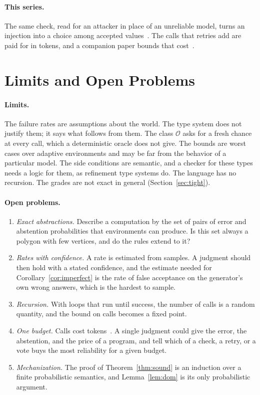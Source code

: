 \documentclass[acmsmall,nonacm,screen]{acmart}
\newcommand{\cO}{\mathcal{O}}
\begin{document}
\paragraph{This series.} The same check, read for an attacker in place of an unreliable
model, turns an injection into a choice among accepted values~\citep{tpp7}. The calls that
retries add are paid for in tokens, and a companion paper bounds that
cost~\citep{tpp6}.

\section{Limits and Open Problems}
\label{sec:limits}

\paragraph{Limits.} The failure rates are assumptions about the world. The type system does
not justify them; it says what follows from them. The class $\cO$ asks for a fresh chance at
every call, which a deterministic oracle does not give. The bounds are worst cases over
adaptive environments and may be far from the behavior of a particular model. The side
conditions are semantic, and a checker for these types needs a logic for them, as refinement
type systems do. The language has no recursion. The grades are not exact in general
(Section~\ref{sec:tight}).

\paragraph{Open problems.}
\begin{enumerate}
\item \emph{Exact abstractions.} Describe a computation by the set of pairs of error and
abstention probabilities that environments can produce. Is this set always a polygon with
few vertices, and do the rules extend to it?
\item \emph{Rates with confidence.} A rate is estimated from samples. A judgment should then
hold with a stated confidence, and the estimate needed for
Corollary~\ref{cor:imperfect} is the rate of false acceptance on the generator's own wrong
answers, which is the hardest to sample.
\item \emph{Recursion.} With loops that run until success, the number of calls is a random
quantity, and the bound on calls becomes a fixed point.
\item \emph{One budget.} Calls cost tokens~\citep{tpp6}. A single judgment could give the
error, the abstention, and the price of a program, and tell which of a check, a retry, or a
vote buys the most reliability for a given budget.
\item \emph{Mechanization.} The proof of Theorem~\ref{thm:sound} is an induction over a
finite probabilistic semantics, and Lemma~\ref{lem:dom} is its only probabilistic argument.
\end{enumerate}
\end{document}

